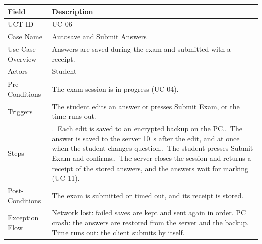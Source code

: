 \begin{lrbox}{\uctbox}{\small\renewcommand{\arraystretch}{1.1}\setlength{\tabcolsep}{6pt}%
\begin{tabular}{>{\raggedright\arraybackslash}p{3.6cm}>{\raggedright\arraybackslash}p{\dimexpr\textwidth-3.6cm-4\tabcolsep\relax}}
\hline\hline
\textbf{Field} & \textbf{Description} \\ \hline
UCT ID & UC-06 \\
Case Name & Autosave and Submit Answers \\
Use-Case Overview & Answers are saved during the exam and submitted with a receipt. \\
Actors & Student \\
Pre-Conditions & The exam session is in progress (UC-04). \\
Triggers & The student edits an answer or presses Submit Exam, or the time runs out. \\
Steps & 1.~Each edit is saved to an encrypted backup on the PC.\newline
2.~The answer is saved to the server 10~s after the edit, and at once when the student changes question.\newline
3.~The student presses Submit Exam and confirms.\newline
4.~The server closes the session and returns a receipt of the stored answers, and the answers wait for marking (UC-11). \\
Post-Conditions & The exam is submitted or timed out, and its receipt is stored. \\
Exception Flow & Network lost: failed saves are kept and sent again in order. PC crash: the answers are restored from the server and the backup. Time runs out: the client submits by itself. \\
\hline\hline
\end{tabular}}\end{lrbox}
\begin{table}[H]
\centering
\caption{Use Case Table for Autosave and Submit Answers}\label{tab:uc06}
\vspace{4pt}
\usebox{\uctbox}
\end{table}


